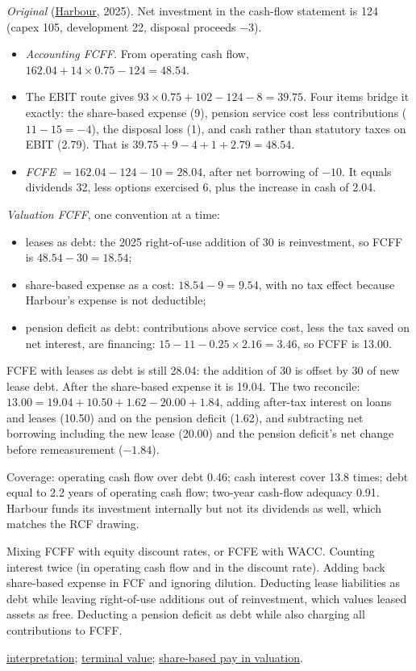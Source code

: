 \begin{qfmethod}
 \emph{Original} (\hyperref[ex:harbour-tools-statements]{Harbour}, 2025). Net investment in the cash-flow statement is 124 (capex 105, development 22, disposal proceeds $-3$).
\begin{itemize}
\item \emph{Accounting FCFF.} From operating cash flow, $162.04+14\times0.75-124=48.54$.
\item The EBIT route gives $93\times0.75+102-124-8=39.75$. Four items bridge it exactly: the share-based expense (9), pension service cost less contributions ($11-15=-4$), the disposal loss (1), and cash rather than statutory taxes on EBIT (2.79). That is $39.75+9-4+1+2.79=48.54$.
\item \emph{FCFE} $=162.04-124-10=28.04$, after net borrowing of $-10$. It equals dividends 32, less options exercised 6, plus the increase in cash of 2.04.
\end{itemize}
\emph{Valuation FCFF}, one convention at a time:
\begin{itemize}
\item leases as debt: the 2025 right-of-use addition of 30 is reinvestment, so FCFF is $48.54-30=18.54$;
\item share-based expense as a cost: $18.54-9=9.54$, with no tax effect because Harbour's expense is not deductible;
\item pension deficit as debt: contributions above service cost, less the tax saved on net interest, are financing: $15-11-0.25\times2.16=3.46$, so FCFF is 13.00.
\end{itemize}
FCFE with leases as debt is still 28.04: the addition of 30 is offset by 30 of new lease debt. After the share-based expense it is 19.04. The two reconcile: $13.00=19.04+10.50+1.62-20.00+1.84$, adding after-tax interest on loans and leases (10.50) and on the pension deficit (1.62), and subtracting net borrowing including the new lease (20.00) and the pension deficit's net change before remeasurement ($-1.84$).

Coverage: operating cash flow over debt 0.46; cash interest cover 13.8 times; debt equal to 2.2 years of operating cash flow; two-year cash-flow adequacy 0.91. Harbour funds its investment internally but not its dividends as well, which matches the RCF drawing.

 Mixing FCFF with equity discount rates, or FCFE with WACC. Counting interest twice (in operating cash flow and in the discount rate). Adding back share-based expense in FCF and ignoring dilution. Deducting lease liabilities as debt while leaving right-of-use additions out of reinvestment, which values leased assets as free. Deducting a pension deficit as debt while also charging all contributions to FCFF.

 \hyperref[meth:cash-flow-interpretation]{interpretation}; \hyperref[meth:forecast-horizon-steady-state]{terminal value}; \hyperref[meth:share-based-compensation-modelling]{share-based pay in valuation}.

\end{qfmethod}
